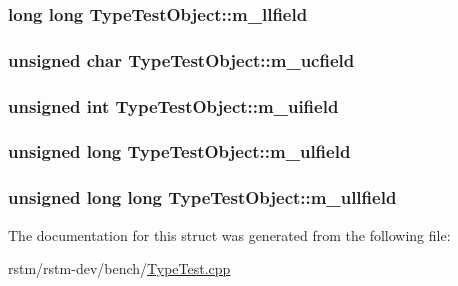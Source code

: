 \hypertarget{structTypeTestObject_a0534c9fd1e8b5ccbc69e832cbba13db9}{
\subsubsection[{m\-\_\-llfield}]{\setlength{\rightskip}{0pt plus 5cm}long long Type\-Test\-Object\-::m\-\_\-llfield}}\label{structTypeTestObject_a0534c9fd1e8b5ccbc69e832cbba13db9}
\hypertarget{structTypeTestObject_a77c4c5e8cecc69a155ec16e65f5ec256}{
\subsubsection[{m\-\_\-ucfield}]{\setlength{\rightskip}{0pt plus 5cm}unsigned char Type\-Test\-Object\-::m\-\_\-ucfield}}\label{structTypeTestObject_a77c4c5e8cecc69a155ec16e65f5ec256}
\hypertarget{structTypeTestObject_afa1ba65c44170e3e67349b226d025a11}{
\subsubsection[{m\-\_\-uifield}]{\setlength{\rightskip}{0pt plus 5cm}unsigned int Type\-Test\-Object\-::m\-\_\-uifield}}\label{structTypeTestObject_afa1ba65c44170e3e67349b226d025a11}
\hypertarget{structTypeTestObject_a219515b380b5f43f8646199805b4a2d6}{
\subsubsection[{m\-\_\-ulfield}]{\setlength{\rightskip}{0pt plus 5cm}unsigned long Type\-Test\-Object\-::m\-\_\-ulfield}}\label{structTypeTestObject_a219515b380b5f43f8646199805b4a2d6}
\hypertarget{structTypeTestObject_a7db847d5c534c1759b5f9fd3c9c401fa}{
\subsubsection[{m\-\_\-ullfield}]{\setlength{\rightskip}{0pt plus 5cm}unsigned long long Type\-Test\-Object\-::m\-\_\-ullfield}}\label{structTypeTestObject_a7db847d5c534c1759b5f9fd3c9c401fa}


The documentation for this struct was generated from the following file\-:\begin{DoxyCompactItemize}
\item 
rstm/rstm-\/dev/bench/\hyperlink{TypeTest_8cpp}{Type\-Test.\-cpp}\end{DoxyCompactItemize}
